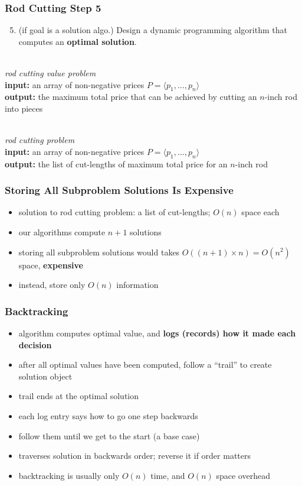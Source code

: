 \documentclass[10pt,aspectratio=169]{beamer}
\newcommand{\stanza}{ \\~\ }
\begin{document}
\begin{frame} \frametitle{Rod Cutting Step 5}
  \begin{enumerate}
    \setcounter{enumi}{4}
    \item (if goal is a solution algo.) Design a dynamic programming algorithm that computes an \textbf{optimal solution}.
    \stanza
  \end{enumerate}

  
  \emph{rod cutting value problem} \\
  \textbf{input:} an array of non-negative prices $P=\langle p_1, \ldots, p_n \rangle$ \\
  \textbf{output:} the maximum total price that can be achieved by cutting an $n$-inch rod into pieces
  \stanza

  \emph{rod cutting problem} \\
  \textbf{input:} an array of non-negative prices $P=\langle p_1, \ldots, p_n \rangle$ \\
  \textbf{output:} the list of cut-lengths of maximum total price for an $n$-inch rod

\end{frame}

\begin{frame} \frametitle{Storing All Subproblem Solutions Is Expensive}
  \begin{itemize}
    \item solution to rod cutting problem: a list of cut-lengths; $O(n)$ space each
    \item our algorithms compute $n+1$ solutions
    \item storing all subproblem solutions would takes $O((n+1)\times n) = O(n^2)$ space, \textbf{expensive}
    \item instead, store only $O(n)$ information
  \end{itemize}
\end{frame}

\begin{frame} \frametitle{Backtracking}
  \begin{itemize}
    \item algorithm computes optimal value, and \textbf{logs (records) how it made each decision}
    \item after all optimal values have been computed, follow a ``trail'' to create solution object
    \item trail ends at the optimal solution
    \item each log entry says how to go one step backwards
    \item follow them until we get to the start (a base case)
    \item traverses solution in backwards order; reverse it if order matters
    \item backtracking is usually only $O(n)$ time, and $O(n)$ space overhead
  \end{itemize}
\end{frame}
\end{document}
